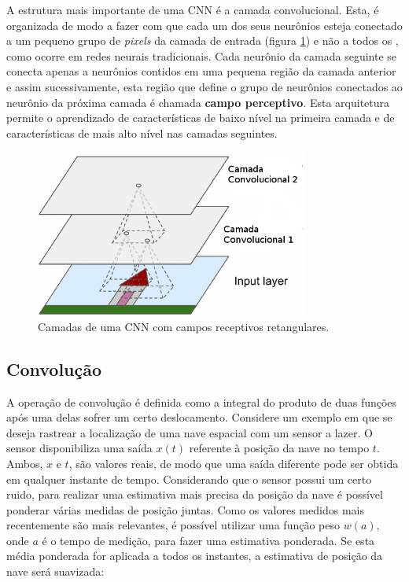 A estrutura mais importante de uma CNN é a camada convolucional. Esta, é organizada
de modo a fazer com que cada um dos seus neurônios esteja conectado a um 
pequeno grupo de \textit{pixels} da camada de entrada (figura \ref{fig:cnn_arq}) e não a todos os , como
ocorre em redes neurais tradicionais. Cada neurônio da camada seguinte se conecta apenas a neurônios
contidos em uma pequena região da camada anterior e assim sucessivamente, esta região que define
o grupo de neurônios conectados ao neurônio da próxima camada é chamada \textbf{campo perceptivo}. Esta arquitetura permite o
aprendizado de características de baixo nível na primeira camada e de características de mais alto nível
nas camadas seguintes.

\begin{figure}[htp]
\begin{center}
  \includegraphics[width=0.8\textwidth]{fig/cnn_arq}
  \caption{Camadas de uma CNN com campos receptivos retangulares.}
  \label{fig:cnn_arq}
\end{center}
\end{figure}

\subsection{Convolução}
A operação de convolução é definida como a integral do produto de duas funções após uma delas sofrer um
certo deslocamento. Considere um exemplo em que se deseja rastrear a localização de uma
nave espacial com um sensor a lazer. O sensor disponibiliza uma saída $x(t)$ referente à posição da nave
no tempo $t$. Ambos, $x$ e $t$, são valores reais, de modo que uma saída diferente pode ser obtida
em qualquer instante de tempo. Considerando que o sensor possui um certo ruido, para realizar uma
estimativa mais precisa da posição da nave é possível ponderar várias medidas de posição juntas.
Como os valores medidos mais recentemente são mais relevantes, é possível utilizar uma função peso
$w(a)$, onde $a$ é o tempo de medição, para fazer uma estimativa ponderada. Se esta média ponderada for aplicada a todos os instantes,
a estimativa de posição da nave será suavizada:

